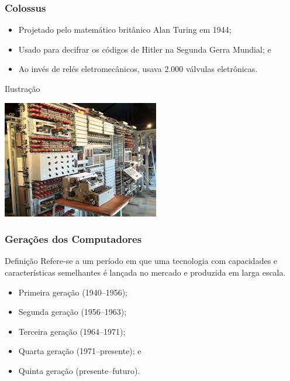 \documentclass[aspectratio=169]{beamer} %
\begin{document}
\begin{frame}
	\frametitle{Colossus}
	
	\begin{itemize}
		\item Projetado pelo matemático britânico Alan Turing em 1944;
		\item Usado para decifrar os códigos de Hitler na Segunda Gerra Mundial; e
		\item Ao invés de relés eletromecânicos, usava 2.000 válvulas eletrônicas.
	\end{itemize}\vfill
	
	\begin{exampleblock}{Ilustra\c cão}
		\begin{center}
			\includegraphics[scale=0.5]{img/colossus}
		\end{center}
	\end{exampleblock}
\end{frame}

\begin{frame}
	\frametitle{Gera\c cões dos Computadores}
	
	\begin{block}{Defini\c cão}
		Refere-se a um período em que uma tecnologia com capacidades e características semelhantes é lan\c cada no mercado e produzida em larga escala.
	\end{block}
	
	\begin{itemize}
		\item Primeira gera\c cão (1940--1956);
		\item Segunda gera\c cão (1956--1963);
		\item Terceira gera\c cão (1964--1971);
		\item Quarta gera\c cão (1971--presente); e
		\item Quinta gera\c cão (presente--futuro).
	\end{itemize}
\end{frame}
\end{document}

